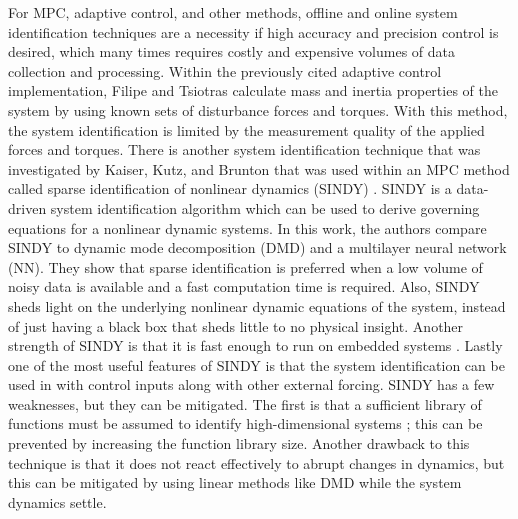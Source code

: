 \documentclass[letterpaper, preprint, paper,11pt]{AAS}	%
\begin{document}
For MPC, adaptive control, and other methods, offline and online system identification techniques are a necessity if high accuracy and precision control is desired, which many times requires costly and expensive volumes of data collection and processing. Within the previously cited adaptive control implementation, Filipe and Tsiotras calculate mass and inertia properties of the system by using known sets of disturbance forces and torques. With this method, the system identification is limited by the measurement quality of the applied forces and torques. There is another system identification technique that was investigated by Kaiser, Kutz, and Brunton that was used within an MPC method called sparse identification of nonlinear dynamics (SINDY) \cite{KaiserKutz_SparseID}. SINDY is a data-driven system identification algorithm which can be used to derive governing equations for a nonlinear dynamic systems. In this work, the authors compare SINDY to dynamic mode decomposition (DMD) and a multilayer neural network (NN). They show that sparse identification is preferred when a low volume of noisy data is available and a fast computation time is required. Also, SINDY sheds light on the underlying nonlinear dynamic equations of the system, instead of just having a black box that sheds little to no physical insight. Another strength of SINDY is that it is fast enough to run on embedded systems \cite{provost_williams_SINDY}. Lastly one of the most useful features of SINDY is that the system identification can be used in with control inputs along with other external forcing. SINDY has a few weaknesses, but they can be mitigated. The first is that a sufficient library of functions must be assumed to identify high-dimensional systems \cite{KaiserKutz_SparseID}; this can be prevented by increasing the function library size. Another drawback to this technique is that it does not react effectively to abrupt changes in dynamics, but this can be mitigated by using linear methods like DMD while the system dynamics settle\cite{KaiserKutz_SparseID}.
 
\end{document}
